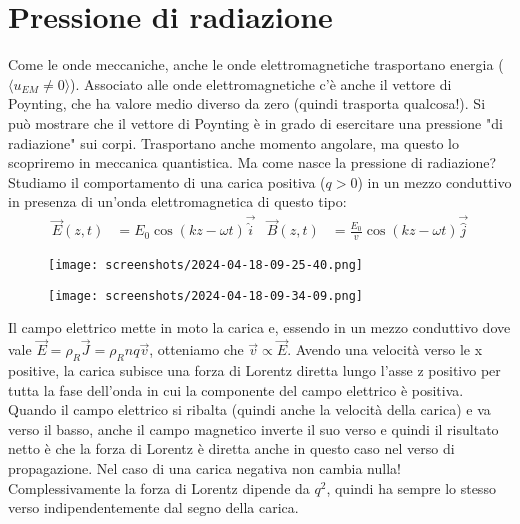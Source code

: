 \section{Pressione di radiazione}
Come le onde meccaniche, anche le onde elettromagnetiche trasportano energia (\(\langle u_{EM} \neq 0 \rangle \)). Associato alle onde elettromagnetiche c'è anche il vettore di Poynting, che ha valore medio diverso da zero (quindi trasporta qualcosa!). Si può mostrare che il vettore di Poynting è in grado di esercitare una pressione "di radiazione" sui corpi. Trasportano anche momento angolare, ma questo lo scopriremo in meccanica quantistica.
Ma come nasce la pressione di radiazione? Studiamo il comportamento di una carica positiva (\(q>0\)) in un mezzo conduttivo in presenza di un'onda elettromagnetica di questo tipo:
\begin{align}
	\vec{E}(z,t)&= E_0 \cos (kz- \omega t) \vec{\hat{i}} & 
	\vec{B}(z,t)&=\frac{E_0}{v} \cos (kz - \omega t) \vec{\hat{j}}
\end{align}
\begin{figure}[H]
	\begin{minipage}[t]{0.5\textwidth}
        \centering
        \texttt{[image: screenshots/2024-04-18-09-25-40.png]}
    \end{minipage}%
	\hfill%
    \begin{minipage}[t]{0.5\textwidth}
        \centering
        \texttt{[image: screenshots/2024-04-18-09-34-09.png]}
    \end{minipage}
\end{figure}
Il campo elettrico mette in moto la carica e, essendo in un mezzo conduttivo dove vale \(\vec{E}=\rho _R \vec{J}=\rho _R n q \vec{v}\), otteniamo che \(\vec{v} \propto \vec{E}\). Avendo una velocità verso le x positive, la carica subisce una forza di Lorentz diretta lungo l'asse z positivo per tutta la fase dell'onda in cui la componente del campo elettrico è positiva. Quando il campo elettrico si ribalta (quindi anche la velocità della carica) e va verso il basso, anche il campo magnetico inverte il suo verso e quindi il risultato netto è che la forza di Lorentz è diretta anche in questo caso nel verso di propagazione. Nel caso di una carica negativa non cambia nulla! Complessivamente la forza di Lorentz dipende da \(q ^{2} \), quindi ha sempre lo stesso verso indipendentemente dal segno della carica.

